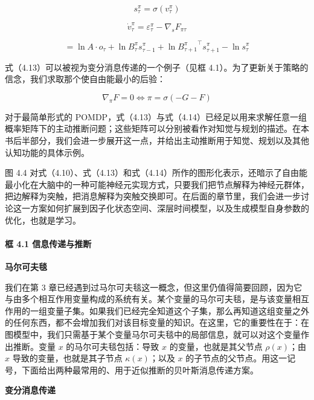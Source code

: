 \begin{equation}
s^\pi_\tau = \sigma(v^\pi_\tau)
\tag{4.13}
\end{equation}

\begin{equation}
\dot{v}^\pi_\tau = \varepsilon^\pi_\tau - \nabla_s F_{\pi\tau}
\tag{4.13}
\end{equation}

\begin{equation}
= \ln A \cdot o_\tau + \ln B^\pi_\tau s^\pi_{\tau-1}
+ \ln {B^\pi_{\tau+1}}^\top s^\pi_{\tau+1}
- \ln s^\pi_\tau
\tag{4.13}
\end{equation}

式（4.13）可以被视为变分消息传递的一个例子（见框 4.1）。为了更新关于策略的信念，我们求取那个使自由能最小的后验：

\begin{equation}
\nabla_\pi F = 0
\Leftrightarrow
\pi = \sigma(-G - F)
\tag{4.14}
\end{equation}

对于最简单形式的 POMDP，式（4.13）与式（4.14）已经足以用来求解任意一组概率矩阵下的主动推断问题；这些矩阵可以分别被看作对知觉与规划的描述。在本书后半部分，我们会进一步展开这一点，并给出主动推断用于知觉、规划以及其他认知功能的具体示例。

图 4.4 对式（4.10）、式（4.13）和式（4.14）所作的图形化表示，还暗示了自由能最小化在大脑中的一种可能神经元实现方式，只要我们把节点解释为神经元群体，把边解释为突触，把消息解释为突触交换即可。在后面的章节里，我们会进一步讨论这一方案如何扩展到因子化状态空间、深层时间模型，以及生成模型自身参数的优化，也就是学习。

\paragraph{框 4.1 信息传递与推断}
\textbf{马尔可夫毯}

我们在第 3 章已经遇到过马尔可夫毯这一概念，但这里仍值得简要回顾，因为它与由多个相互作用变量构成的系统有关。某个变量的马尔可夫毯，是与该变量相互作用的一组变量子集。如果我们已经完全知道这个子集，那么再知道这组变量之外的任何东西，都不会增加我们对该目标变量的知识。在这里，它的重要性在于：在图模型中，我们只需基于某个变量马尔可夫毯中的局部信息，就可以对这个变量作出推断。变量 $x$ 的马尔可夫毯包括：导致 $x$ 的变量，也就是其父节点 $\rho(x)$；由 $x$ 导致的变量，也就是其子节点 $\kappa(x)$；以及 $x$ 的子节点的父节点。用这一记号，下面给出两种最常用的、用于近似推断的贝叶斯消息传递方案。

\textbf{变分消息传递}

